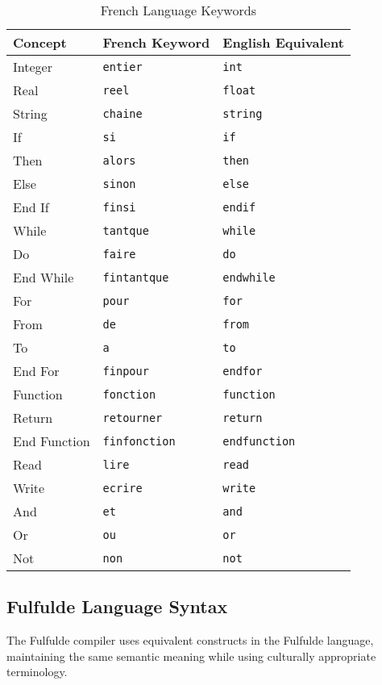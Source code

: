 \documentclass[12pt,a4paper]{article}
\begin{document}
\begin{table}[htbp]
\centering
\caption{French Language Keywords}
\label{tab:french-keywords}
\begin{tabular}{@{}lll@{}}
\toprule
\textbf{Concept} & \textbf{French Keyword} & \textbf{English Equivalent} \\
\midrule
Integer & \texttt{entier} & \texttt{int} \\
Real & \texttt{reel} & \texttt{float} \\
String & \texttt{chaine} & \texttt{string} \\
If & \texttt{si} & \texttt{if} \\
Then & \texttt{alors} & \texttt{then} \\
Else & \texttt{sinon} & \texttt{else} \\
End If & \texttt{finsi} & \texttt{endif} \\
While & \texttt{tantque} & \texttt{while} \\
Do & \texttt{faire} & \texttt{do} \\
End While & \texttt{fintantque} & \texttt{endwhile} \\
For & \texttt{pour} & \texttt{for} \\
From & \texttt{de} & \texttt{from} \\
To & \texttt{a} & \texttt{to} \\
End For & \texttt{finpour} & \texttt{endfor} \\
Function & \texttt{fonction} & \texttt{function} \\
Return & \texttt{retourner} & \texttt{return} \\
End Function & \texttt{finfonction} & \texttt{endfunction} \\
Read & \texttt{lire} & \texttt{read} \\
Write & \texttt{ecrire} & \texttt{write} \\
And & \texttt{et} & \texttt{and} \\
Or & \texttt{ou} & \texttt{or} \\
Not & \texttt{non} & \texttt{not} \\
\bottomrule
\end{tabular}
\end{table}

\subsection{Fulfulde Language Syntax}

The Fulfulde compiler uses equivalent constructs in the Fulfulde language, maintaining the same semantic meaning while using culturally appropriate terminology.
\end{document}
